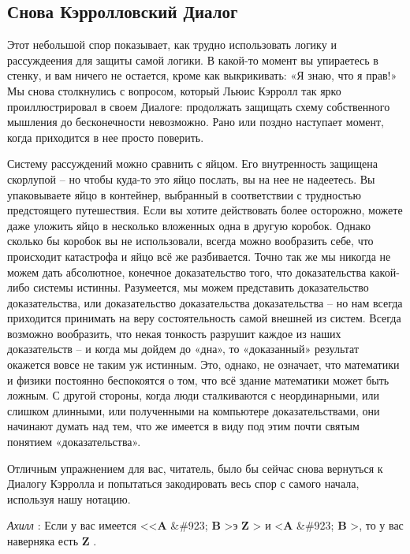 \documentclass[../main.tex]{subfiles}
\begin{document}
\subsection{Снова Кэрролловский Диалог}

Этот небольшой спор показывает, как трудно использовать логику и рассуждеения для защиты самой логики. В какой-то момент вы упираетесь в стенку, и вам ничего не остается, кроме как выкрикивать: «Я знаю, что я прав!» Мы снова столкнулись с вопросом, который Льюис Кэрролл так ярко проиллюстрировал в своем Диалоге: продолжать защищать схему собственного мышления до бесконечности невозможно. Рано или поздно наступает момент, когда приходится в нее просто поверить.

Систему рассуждений можно сравнить с яйцом. Его внутренность защищена скорлупой \--- но чтобы куда-то это яйцо послать, вы на нее не надеетесь. Вы упаковываете яйцо в контейнер, выбранный в соответствии с трудностью предстоящего путешествия. Если вы хотите действовать более осторожно, можете даже уложить яйцо в несколько вложенных одна в другую коробок. Однако сколько бы коробок вы не использовали, всегда можно вообразить себе, что происходит катастрофа и яйцо всё же разбивается. Точно так же мы никогда не можем дать абсолютное, конечное доказательство того, что доказательства какой-либо системы истинны. Разумеется, мы можем представить доказательство доказательства, или доказательство доказательства доказательства \--- но нам всегда приходится принимать на веру состоятельность самой внешней из систем. Всегда возможно вообразить, что некая тонкость разрушит каждое из наших доказательств \--- и когда мы дойдем до «дна», то «доказанный» результат окажется вовсе не таким уж истинным. Это, однако, не означает, что математики и физики постоянно беспокоятся о том, что всё здание математики может быть ложным. С другой стороны, когда люди сталкиваются с неординарными, или слишком длинными, или полученными на компьютере доказательствами, они начинают думать над тем, что же имеется в виду под этим почти святым понятием «доказательства».

Отличным упражнением для вас, читатель, было бы сейчас снова вернуться к Диалогу Кэрролла и попытаться закодировать весь спор с самого начала, используя нашу нотацию.

\emph{Ахилл} : Если у вас имеется \textless\textless{}\textbf{A} \&\#923; \textbf{B} \textgreater э \textbf{Z} \textgreater{} и \textless{}\textbf{A} \&\#923; \textbf{B} \textgreater, то у вас наверняка есть \textbf{Z} .
\end{document}

